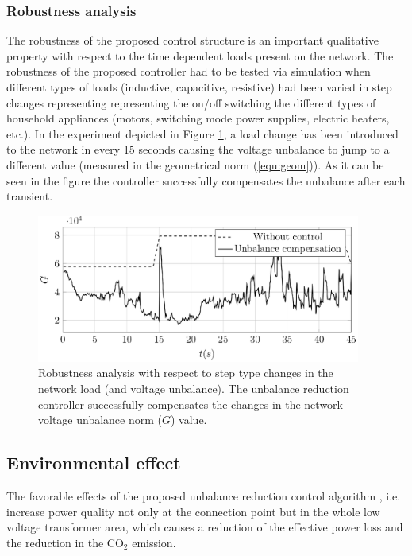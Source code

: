       \subsubsection{Robustness analysis}\label{VUB:sec:Robustness}

            The robustness of the proposed control structure is an important qualitative property with respect to the time dependent loads present on the network. The robustness of the proposed controller had to be tested via simulation when different types of loads (inductive, capacitive, resistive) had been varied in step changes representing representing the on/off switching the different types of household appliances (motors, switching mode power supplies, electric heaters, etc.). In the experiment depicted in Figure \ref{fig:robustness}, a load change has been introduced to the network in every 15 seconds causing the voltage unbalance to jump to a different value (measured in the geometrical norm (\ref{equ:geom})). As it can be seen in the figure the controller successfully compensates the unbalance after each transient.

              \begin{figure}[ht]
            \centering
            \includegraphics[width=0.95\textwidth]{Unblance_EPS_Pics/UnbalRedComp_JCP-figure5.eps}
            \caption{Robustness analysis with respect to step type changes in the network load (and voltage unbalance). The unbalance reduction controller successfully compensates the changes in the network voltage unbalance norm ($G$) value.}
            \label{fig:robustness}
            \end{figure}

    \subsection{Environmental effect}\label{VUB:sec:Environment}

    The favorable effects of the proposed unbalance reduction control algorithm , i.e. increase power quality not only at the connection point but in the whole low voltage transformer area, which causes a reduction of the effective power loss and the reduction in the CO${}_2$ emission.

